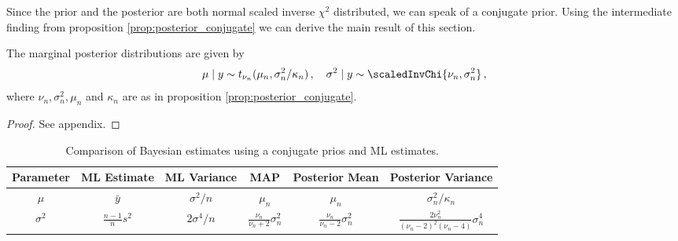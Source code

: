 Since the prior and the posterior are both normal scaled inverse $\chi^2$ distributed, we can speak of a conjugate prior.
Using the intermediate finding from proposition \ref{prop:posterior_conjugate} we can derive the main result of this section.

\begin{proposition}\label{prop:marginal_posterior}
  The marginal posterior distributions are given by
  \begin{align*}
    \mu \mid y \sim t_{\nu_n}(\mu_n, \sigma_n^2 / \kappa_n)\,, \quad \sigma^2 \mid y \sim \scaledInvChi{\nu_n, \sigma_n^2}\,,
  \end{align*}
  where $\nu_n, \sigma_n^2, \mu_n$ and $\kappa_n$ are as in proposition \ref{prop:posterior_conjugate}.
\end{proposition}
\begin{proof}
  See appendix.
\end{proof}

\begin{table}[ht]
\centering
\def\arraystretch{1.3}
{\small
 \begin{tabular}{c | c c c c c}
 Parameter & ML Estimate & ML Variance & MAP & Posterior Mean & Posterior Variance\\
 \hline
 $\mu$ & $\bar{y}$ & $\sigma^2 / n$ & $\mu_n$ & $\mu_n$ & $\sigma_n^2 / \kappa_n$\\
 $\sigma^2$ & $\frac{n-1}{n}s^2$ & $2 \sigma^4 / n$ & $\frac{\nu_n}{\nu_n + 2} \sigma_n^2$ & $\frac{\nu_n}{\nu_n - 2} \sigma_n^2$ & $\frac{2 \nu_n^2}{(\nu_n - 2)^2(\nu_n - 4)} \sigma_n^4$
 \end{tabular}
 }
\caption{{\small Comparison of Bayesian estimates using a conjugate prios and ML estimates.}}
\label{tab:comp_conjugate_bay_ml}
\end{table}


